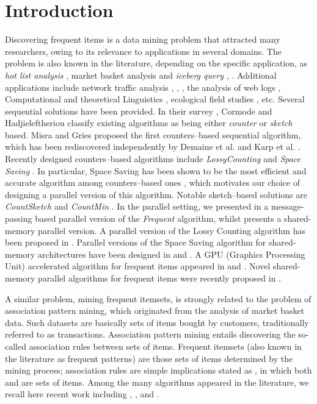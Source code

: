 \documentclass[final,3p,times]{elsarticle}
\begin{document}
\section{Introduction}
\label{intro}
Discovering frequent items is a  data mining problem that attracted many researchers, owing to its relevance to  applications in  several domains. The problem is also known in the literature, depending on the specific application, as \textit{hot list analysis} \cite{Gibbons}, market basket analysis \cite{Brin} and  \textit{iceberg query} \cite{Fang98computingiceberg}, \cite{Beyer99bottom-upcomputation}. Additional applications include network traffic analysis \cite{DemaineLM02},  \cite{Estan}, \cite{Pan}, the analysis of web logs \cite{Charikar}, Computational and theoretical Linguistics \cite{CICLing}, ecological field studies \cite{Mouillot}, etc.
Several sequential solutions have been provided. In their survey \cite{Cormode}, Cormode and Hadjieleftheriou classify existing algorithms as being either \emph{counter} or \emph{sketch} based. Misra and Gries \cite{Misra82} proposed the first counters--based sequential algorithm, which has been rediscovered independently by Demaine et al. \cite{DemaineLM02} and Karp et al. \cite{Karp}. Recently designed counters--based algorithms include \emph{LossyCounting}
\cite{Manku02approximatefrequency} and \emph{Space Saving} \cite{Metwally2006}. In particular, Space Saving has been shown to be the most efficient and accurate algorithm among counters--based ones \cite{Cormode}, which motivates our choice of designing a parallel version of this algorithm.
Notable sketch--based solutions are \emph{CountSketch} \cite{Charikar} and \emph{CountMin} \cite{Cormode05}. In the parallel setting, we presented in \cite{cafaro-tempesta} a message-passing based parallel version of the \emph{Frequent} algorithm, whilst \cite{Zhang2013} presents a shared-memory parallel version.  A parallel version of the Lossy Counting algorithm has been proposed in \cite{Zhang2012}. Parallel versions of the Space Saving algorithm for shared-memory architectures have been designed in \cite{Roy2012} and \cite{Das2009}. A GPU (Graphics Processing Unit) accelerated algorithm for frequent items appeared in \cite{Govindaraju2005} and \cite{Erra2012}. Novel shared-memory parallel algorithms for frequent items were recently proposed in \cite{Tangwongsan2014}.

A similar problem, mining frequent itemsets, is strongly related to the problem of association pattern mining, which originated from the analysis of market basket data. Such datasets are basically sets of items bought by customers, traditionally referred to as transactions. Association pattern mining entails discovering the so-called association rules between sets of items. Frequent itemsets (also known in the literature as frequent patterns) are those sets of items determined by the mining process; association rules are simple implications stated as , in which both  and  are sets of items. Among the many algorithms appeared in the literature, we recall here recent work including \cite{fis1}, \cite{fis2}, \cite{fis3} and \cite{fis4}.
\end{document}

